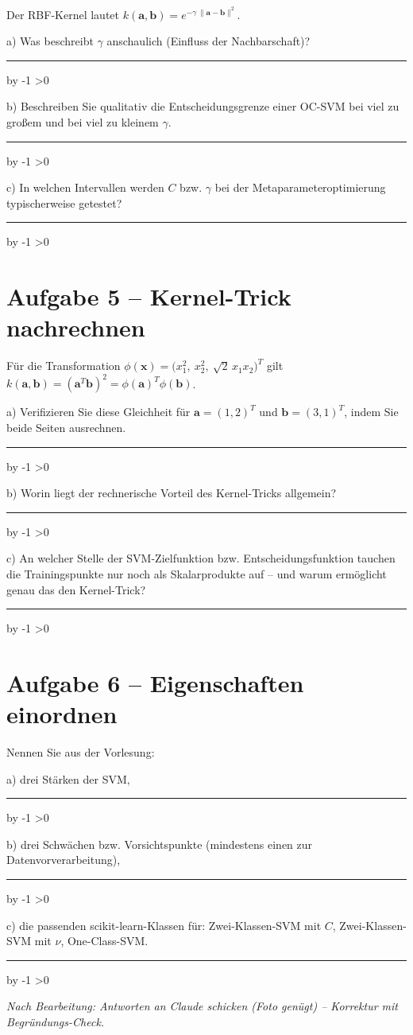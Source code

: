 \documentclass[10pt,a4paper]{article}
\newcommand{\antwortlinien}[1]{%
  \par\vspace{2pt}%
  \newcount\zeilen \zeilen=#1
  \loop
    \noindent\rule{\linewidth}{0.4pt}\par\vspace{11pt}%
    \advance\zeilen by -1
  \ifnum\zeilen>0 \repeat
}
\begin{document}
Der RBF-Kernel lautet $k(\boldsymbol{a},\boldsymbol{b}) = e^{-\gamma\,\|\boldsymbol{a}-\boldsymbol{b}\|^2}$.

a) Was beschreibt $\gamma$ anschaulich (Einfluss der Nachbarschaft)?
\antwortlinien{2}

b) Beschreiben Sie qualitativ die Entscheidungsgrenze einer OC-SVM bei viel zu großem
und bei viel zu kleinem $\gamma$.
\antwortlinien{3}

c) In welchen Intervallen werden $C$ bzw. $\gamma$ bei der Metaparameteroptimierung
typischerweise getestet?
\antwortlinien{2}

\section*{Aufgabe 5 -- Kernel-Trick nachrechnen}

Für die Transformation
$\phi(\boldsymbol{x}) = \bigl(x_1^2,\ x_2^2,\ \sqrt{2}\,x_1 x_2\bigr)^T$
gilt $k(\boldsymbol{a},\boldsymbol{b}) = (\boldsymbol{a}^T\boldsymbol{b})^2 = \phi(\boldsymbol{a})^T\phi(\boldsymbol{b})$.

a) Verifizieren Sie diese Gleichheit für $\boldsymbol{a}=(1,2)^T$ und $\boldsymbol{b}=(3,1)^T$,
indem Sie beide Seiten ausrechnen.
\antwortlinien{3}

b) Worin liegt der rechnerische Vorteil des Kernel-Tricks allgemein?
\antwortlinien{2}

c) An welcher Stelle der SVM-Zielfunktion bzw. Entscheidungsfunktion tauchen die
Trainingspunkte nur noch als Skalarprodukte auf -- und warum ermöglicht genau das den
Kernel-Trick?
\antwortlinien{3}

\section*{Aufgabe 6 -- Eigenschaften einordnen}

Nennen Sie aus der Vorlesung:

a) drei Stärken der SVM,
\antwortlinien{3}

b) drei Schwächen bzw. Vorsichtspunkte (mindestens einen zur Datenvorverarbeitung),
\antwortlinien{3}

c) die passenden scikit-learn-Klassen für: Zwei-Klassen-SVM mit $C$, Zwei-Klassen-SVM mit
$\nu$, One-Class-SVM.
\antwortlinien{2}

\vspace{10pt}
\begin{center}
\footnotesize\itshape
Nach Bearbeitung: Antworten an Claude schicken (Foto genügt) -- Korrektur mit Begründungs-Check.
\end{center}
\end{document}
